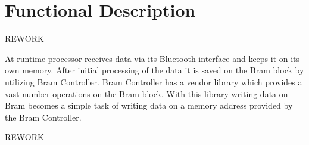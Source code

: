  \section{Functional Description}
 REWORK 
 
 At runtime processor receives data via its Bluetooth interface and keeps it on its own memory. After initial processing of the data it is saved on the Bram block by utilizing Bram Controller. Bram Controller has a vendor library which provides a vast number operations on the Bram block. With this library writing data on Bram becomes a simple task of writing data on a memory address provided by the Bram Controller. 
 
 REWORK 
